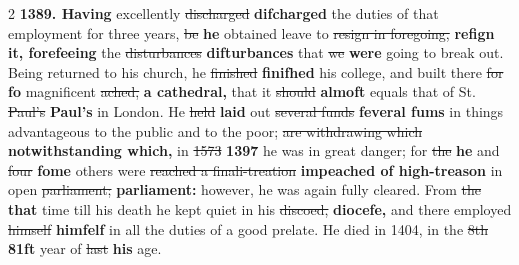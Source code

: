 \documentclass[10pt]{article}
\begin{document}
\begin{multicols}{2}
\textbf{1389. Having} excellently \sout{discharged} \textbf{difcharged} the duties of that employment for three years, \sout{be} \textbf{he} obtained leave to \sout{resign in foregoing,} \textbf{refign it, forefeeing} the \sout{disturbances} \textbf{difturbances} that \sout{we} \textbf{were} going to break out. Being returned to his church, he \sout{finished} \textbf{finifhed} his college, and built there \sout{for} \textbf{fo} magnificent \sout{ached,} \textbf{a cathedral,} that it \sout{should} \textbf{almoft} equals that of St. \sout{Paul’s} \textbf{Paul's} in London. He \sout{held} \textbf{laid} out \sout{several funds} \textbf{feveral fums} in things advantageous to the public and to the poor; \sout{are withdrawing which} \textbf{notwithstanding which,} in \sout{1573} \textbf{1397} he was in great danger; for \sout{the} \textbf{he} and \sout{four} \textbf{fome} others were \sout{reached a finali-treation} \textbf{impeached of high-treason} in open \sout{parliament;} \textbf{parliament:} however, he was again fully cleared. From \sout{the} \textbf{that} time till his death he kept quiet in his \sout{discoed,} \textbf{diocefe,} and there employed \sout{himself} \textbf{himfelf} in all the duties of a good prelate. He died in 1404, in the \sout{8th} \textbf{81ft} year of \sout{last} \textbf{his} age.


\end{multicols}
\end{document}
